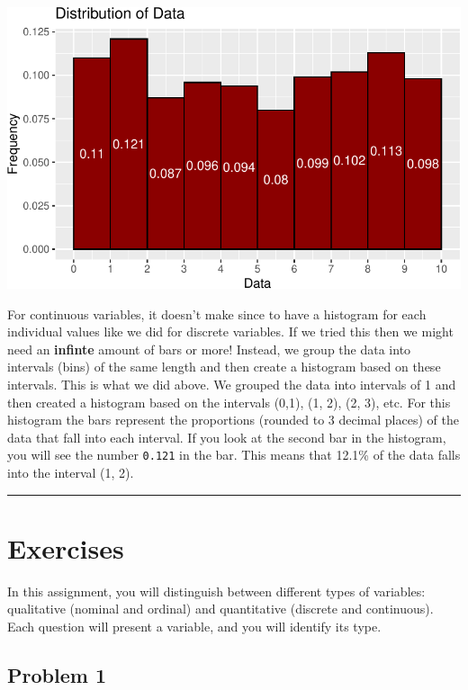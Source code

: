 \documentclass[
  letterpaper,
  DIV=11,
  numbers=noendperiod]{scrreprt}
\begin{document}
\includegraphics{Qualitative_and_Quantitative_Variables_files/figure-pdf/unnamed-chunk-4-1.pdf}

For continuous variables, it doesn't make since to have a histogram for
each individual values like we did for discrete variables. If we tried
this then we might need an \textbf{infinte} amount of bars or more!
Instead, we group the data into intervals (bins) of the same length and
then create a histogram based on these intervals. This is what we did
above. We grouped the data into intervals of 1 and then created a
histogram based on the intervals (0,1), (1, 2), (2, 3), etc. For this
histogram the bars represent the proportions (rounded to 3 decimal
places) of the data that fall into each interval. If you look at the
second bar in the histogram, you will see the number \texttt{0.121} in
the bar. This means that 12.1\% of the data falls into the interval (1,
2).

\begin{center}\rule{0.5\linewidth}{0.5pt}\end{center}

\section*{Exercises}\label{exercises}


In this assignment, you will distinguish between different types of
variables: qualitative (nominal and ordinal) and quantitative (discrete
and continuous). Each question will present a variable, and you will
identify its type.

\subsection*{Problem 1}\label{problem-1}
\end{document}
